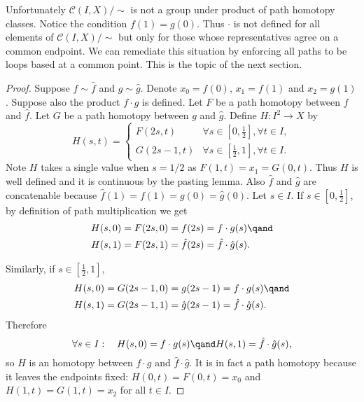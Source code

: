 \begin{remark}
    Unfortunately \(\mathcal{C}(I,X)/\!\!\sim\) is not a group under product of path homotopy classes.  Notice the condition \(f(1)=g(0)\). Thus \(\cdot\) is not defined for all elements of \(\mathcal{C}(I,X)/\!\!\sim\) but  only for those whose representatives agree on a common endpoint. We can remediate this situation by enforcing all paths to be loops based at   a common point. This is the topic of the next section.
\end{remark}

\begin{proof}
    Suppose \(f\sim \hat{f}\) and \(g\sim \hat{g}\). Denote \(x_0 = f(0)\), \(x_1 = f(1)\) and \(x_2=g(1)\). Suppose also  the product \(f\cdot g\) is  defined. Let \(F\) be a path homotopy between \(f\) and \(\hat{f}\). Let \(G\) be a path homotopy between \({g}\) and \(\hat{g}\). Define \(H\colon I^2\to X\) by \[
        H(s,t) = \begin{cases}
            F(2s,t)&\forall s\in[ 0,\frac{1}{2}], \forall t\in I,\\
            G(2s-1,t)&\forall s\in [\frac{1}{2},1], \forall t\in I.
        \end{cases}
    \] Note \(H\) takes a single value when \(s=1/2\) as \(F(1, t) = x_1 = G(0,t)\). Thus \(H\) is well defined and it is continuous by the pasting lemma. Also \(\hat{f}\) and \(\hat{g}\) are concatenable because \(\hat{f} (1) = f(1) = g(0) = \hat{g}(0)\). Let \(s \in I\).
    If \(s\in[0,\frac{1}{2}]\), by definition of path multiplication we get
    \begin{align*}
        H(s,0) &= F(2s, 0) = f(2s) = f\cdot g (s)\qand\\
        H(s,1) &= F(2s, 1) = \hat{f}(2s) = \hat{f}\cdot \hat{g} (s).
    \end{align*}
    
    Similarly, if \(s\in[\frac{1}{2},1]\),
    \begin{align*}
        H(s,0) &= G(2s-1, 0) = g(2s-1) = f\cdot g (s)\qand\\
        H(s,1) &= G(2s-1, 1) = \hat{g}(2s-1) = \hat{f}\cdot \hat{g} (s).
    \end{align*}    
    Therefore \[
        \forall s\in I:\quad H(s,0)= f\cdot g (s)\qand H(s,1)= \hat{f}\cdot \hat{g} (s),
    \] so \(H\) is an homotopy between \(f\cdot g\) and \(\hat{f}\cdot \hat g\). It is in fact a path homotopy because it leaves the endpoints fixed: \(H(0,t) = F(0,t) = x_0\) and \(H(1,t) = G(1,t) = x_2\) for all \(t\in I\).
\end{proof}

